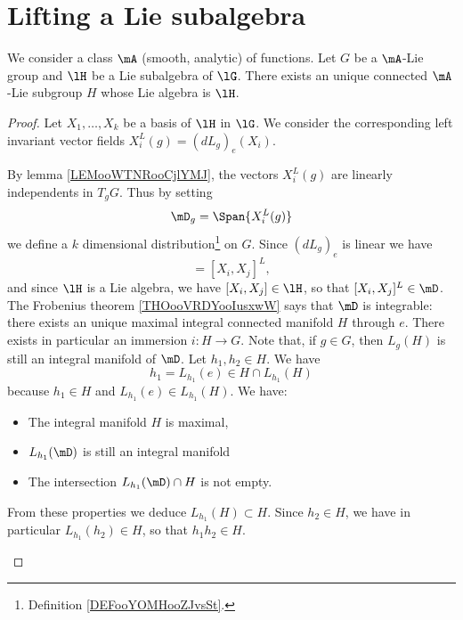 \section{Lifting a Lie subalgebra}

\begin{theorem}       \label{THOooXALIooGiPVdD}
	We consider a class \( \mA\) (smooth, analytic) of functions. Let \( G\) be a \( \mA\)-Lie group and \( \lH\) be a Lie subalgebra of \( \lG\). There exists an unique connected \( \mA\)-Lie subgroup \( H\) whose Lie algebra is \( \lH\).
\end{theorem}

\begin{proof}
	Let \( X_1,\ldots, X_k\) be a basis of \( \lH\) in \( \lG\). We consider the corresponding left invariant vector fields \( X_i^L(g)=(dL_g)_e(X_i)\).
	\begin{subproof}
		\spitem[A distribution]
		By lemma \ref{LEMooWTNRooCjlYMJ}, the vectors \( X_i^L(g)\) are linearly independents in \( T_gG\). Thus by setting
		\begin{equation}
			\mD_g=\Span\{ X_i^L(g) \}
		\end{equation}
		we define a \( k\) dimensional distribution\footnote{Definition \ref{DEFooYOMHooZJvsSt}.} on \( G\).
		\spitem[Involutive]
		Since \( (dL_g)_e\) is linear we have
		\begin{equation}
			[X_i^L,X_j^L]=[X_i,X_j]^L,
		\end{equation}
		and since \( \lH\) is a Lie algebra, we have \( [X_i,X_j]\in \lH\), so that \( [X_i,X_j]^L\in\mD\).
		\spitem[Frobenius]
		The Frobenius theorem \ref{THOooVRDYooIusxwW} says that \( \mD\) is integrable: there exists an unique maximal integral connected manifold \( H\) through \( e\). There exists in particular an immersion \( i\colon H\to G\).
		\spitem[\( H\) is a group]
		Note that, if \( g\in G\), then \( L_g(H)\) is still an integral manifold of \( \mD\). Let \( h_1,h_2\in H\). We have
		\begin{equation}
			h_1=L_{h_1}(e)\in H\cap L_{h_1}(H)
		\end{equation}
		because \( h_1\in H\) and \( L_{h_1}(e)\in L_{h_1}(H)\). We have:
		\begin{itemize}
			\item
			      The integral manifold \( H\) is maximal,
			\item
			      \( L_{h_1}(\mD)\) is still an integral manifold
			\item
			      The intersection \( L_{h_1}(\mD)\cap H\) is not empty.
		\end{itemize}
		From these properties we deduce \( L_{h_1}(H)\subset H\). Since \( h_2\in H\), we have in particular \( L_{h_1}(h_2)\in H\), so that \( h_1h_2\in H\).


\end{subproof}
\end{proof}
